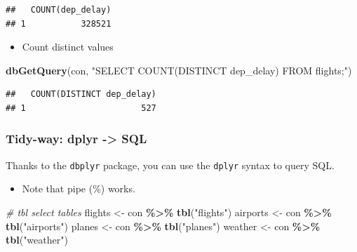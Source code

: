 \documentclass[
]{book}
\newenvironment{Shaded}{\begin{snugshade}}{\end{snugshade}}
\newcommand{\CommentTok}[1]{\textcolor[rgb]{0.56,0.35,0.01}{\textit{#1}}}
\newcommand{\FunctionTok}[1]{\textcolor[rgb]{0.13,0.29,0.53}{\textbf{#1}}}
\newcommand{\NormalTok}[1]{#1}
\newcommand{\OtherTok}[1]{\textcolor[rgb]{0.56,0.35,0.01}{#1}}
\newcommand{\SpecialCharTok}[1]{\textcolor[rgb]{0.81,0.36,0.00}{\textbf{#1}}}
\newcommand{\StringTok}[1]{\textcolor[rgb]{0.31,0.60,0.02}{#1}}
\providecommand{\tightlist}{%
  \setlength{\itemsep}{0pt}\setlength{\parskip}{0pt}}
\begin{document}
\begin{verbatim}
##   COUNT(dep_delay)
## 1           328521
\end{verbatim}

\begin{itemize}
\tightlist
\item
  Count distinct values
\end{itemize}

\begin{Shaded}
\begin{Highlighting}[]
\FunctionTok{dbGetQuery}\NormalTok{(con, }
           \StringTok{"SELECT COUNT(DISTINCT dep\_delay)}
\StringTok{           FROM flights;"}\NormalTok{)}
\end{Highlighting}
\end{Shaded}

\begin{verbatim}
##   COUNT(DISTINCT dep_delay)
## 1                       527
\end{verbatim}

\subsubsection{Tidy-way: dplyr -\textgreater{} SQL}\label{tidy-way-dplyr---sql}

Thanks to the \texttt{dbplyr} package, you can use the \texttt{dplyr} syntax to query SQL.

\begin{itemize}
\tightlist
\item
  Note that pipe (\%) works.
\end{itemize}

\begin{Shaded}
\begin{Highlighting}[]
\CommentTok{\# tbl select tables}
\NormalTok{flights }\OtherTok{\textless{}{-}}\NormalTok{ con }\SpecialCharTok{\%\textgreater{}\%} \FunctionTok{tbl}\NormalTok{(}\StringTok{"flights"}\NormalTok{)}
\NormalTok{airports }\OtherTok{\textless{}{-}}\NormalTok{ con }\SpecialCharTok{\%\textgreater{}\%} \FunctionTok{tbl}\NormalTok{(}\StringTok{"airports"}\NormalTok{)}
\NormalTok{planes }\OtherTok{\textless{}{-}}\NormalTok{ con }\SpecialCharTok{\%\textgreater{}\%} \FunctionTok{tbl}\NormalTok{(}\StringTok{"planes"}\NormalTok{)}
\NormalTok{weather }\OtherTok{\textless{}{-}}\NormalTok{ con }\SpecialCharTok{\%\textgreater{}\%} \FunctionTok{tbl}\NormalTok{(}\StringTok{"weather"}\NormalTok{)}
\end{Highlighting}
\end{Shaded}
\end{document}
